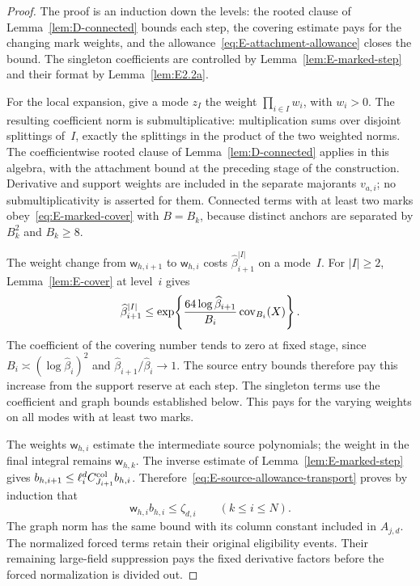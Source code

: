 \begin{proof}
The proof is an induction down the levels: the rooted clause of Lemma~\ref{lem:D-connected} bounds each step, the covering estimate pays for the changing mark weights, and the allowance~\eqref{eq:E-attachment-allowance} closes the bound. The singleton coefficients are controlled by Lemma~\ref{lem:E-marked-step} and their format by Lemma~\ref{lem:E2.2a}.

For the local expansion, give a mode $z_I$ the weight $\prod_{i\in I}w_i$, with $w_i>0$. The resulting coefficient norm is submultiplicative: multiplication sums over disjoint splittings of~$I$, exactly the splittings in the product of the two weighted norms. The coefficientwise rooted clause of Lemma~\ref{lem:D-connected} applies in this algebra, with the attachment bound at the preceding stage of the construction. Derivative and support weights are included in the separate majorants $v_{a,i}$; no submultiplicativity is asserted for them. Connected terms with at least two marks obey~\eqref{eq:E-marked-cover} with $B=B_k$, because distinct anchors are separated by $B_k^2$ and $B_k\ge8$.

The weight change from $\mathsf w_{h,i+1}$ to $\mathsf w_{h,i}$ costs $\widehat\beta_{i+1}^{|I|}$ on a mode~$I$. For $|I|\ge2$, Lemma~\ref{lem:E-cover} at level~$i$ gives
\begin{equation*}
 \widehat\beta_{i+1}^{|I|}
 \le\exp\!\left\{\frac{64\log\widehat\beta_{i+1}}{B_i}
                        \operatorname{cov}_{B_i}(X)\right\}.
\end{equation*}
The coefficient of the covering number tends to zero at fixed stage, since $B_i\asymp(\log\widehat\beta_i)^2$ and $\widehat\beta_{i+1}/\widehat\beta_i\to1$. The source entry bounds therefore pay this increase from the support reserve at each step. The singleton terms use the coefficient and graph bounds established below. This pays for the varying weights on all modes with at least two marks.

The weights $\mathsf w_{h,i}$ estimate the intermediate source polynomials; the weight in the final integral remains $\mathsf w_{h,k}$. The inverse estimate of Lemma~\ref{lem:E-marked-step} gives $b_{h,i+1}\le\ell_i^d C^{\rm col}_{J_{i+1}}b_{h,i}$. Therefore~\eqref{eq:E-source-allowance-transport} proves by induction that
\begin{equation*}
 \mathsf w_{h,i}b_{h,i}\le\zeta_{d,i}\qquad(k\le i\le N).
\end{equation*}
The graph norm has the same bound with its column constant included in $A_{j,d}$. The normalized forced terms retain their original eligibility events. Their remaining large-field suppression pays the fixed derivative factors before the forced normalization is divided out.


\end{proof}
